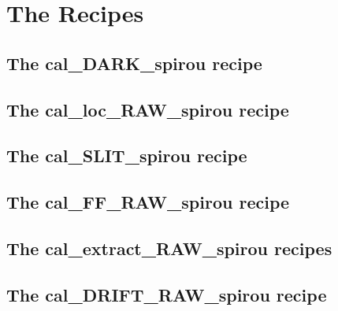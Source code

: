 \chapter{The Recipes}
\label{ch:the_recipes}


\section{The cal\_DARK\_spirou recipe}
\label{ch:the_recipes:cal_DARK_spirou}


\section{The cal\_loc\_RAW\_spirou recipe}
\label{ch:the_recipes:cal_loc_RAW_spirou}


\section{The cal\_SLIT\_spirou recipe}
\label{ch:the_recipes:cal_SLIT_spirou}


\section{The cal\_FF\_RAW\_spirou recipe}
\label{ch:the_recipes:cal_FF_RAW_spirou}


\section{The cal\_extract\_RAW\_spirou recipes}
\label{ch:the_recipes:cal_extract_RAW_spirou}


\section{The cal\_DRIFT\_RAW\_spirou recipe}
\label{ch:the_recipes:cal_DRIFT_RAW_spirou}
